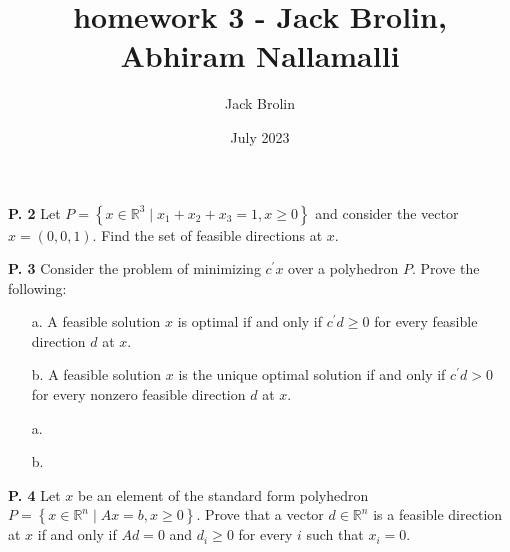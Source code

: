 \documentclass{article}
\title{homework 3 - Jack Brolin, Abhiram Nallamalli}
\author{Jack Brolin}
\date{July 2023}
\begin{document}
\maketitle

\begin{jacklist}
    \begin{framed} 
    \item [\textbf{P. 2}] Let $P=\left\{x \in \mathbb{R}^{3} \mid x_{1}+x_{2}+x_{3}=1, x \geq 0\right\}$ and consider the vector 
        $x=(0,0,1)$. Find the set of feasible directions at $x$.
    \end{framed}

\newpage
    \begin{framed} 
    \item [\textbf{P. 3}] Consider the problem of minimizing $c^{\prime} x$ over a polyhedron $P$. Prove the following:
        \begin{itemize}
            \item [a.] A feasible solution $x$ is optimal if and only if $c^{\prime} d \geq 0$ for every feasible direction $d$ at $x$. 
            \item [b.] A feasible solution $x$ is the unique optimal solution if and only if $c^{\prime} d>0$ 
                for every nonzero feasible direction $d$ at $x$. 
        \end{itemize}
    \end{framed}
    \begin{itemize}
        \item [a.] 
        \item [b.]
    \end{itemize}

\newpage
    \begin{framed} 
    \item [\textbf{P. 4}] Let $x$ be an element of the standard form polyhedron 
        $P=\left\{x \in \mathbb{R}^{n} \mid A x=b, x \geq 0\right\}$. Prove that a vector $d \in \mathbb{R}^{n}$ is a feasible 
        direction at $x$ if and only if $A d=0$ and $d_{i} \geq 0$ for every $i$ such that $x_{i}=0$.
    \end{framed}


\end{jacklist}
\end{document}
